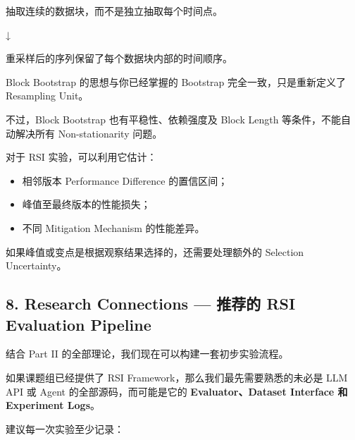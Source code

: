 抽取连续的数据块，而不是独立抽取每个时间点。


↓


重采样后的序列保留了每个数据块内部的时间顺序。

Block Bootstrap 的思想与你已经掌握的 Bootstrap 完全一致，只是重新定义了 Resampling Unit。

不过，Block Bootstrap 也有平稳性、依赖强度及 Block Length 等条件，不能自动解决所有 Non-stationarity 问题。

对于 RSI 实验，可以利用它估计：

\begin{itemize}
\tightlist
\item
  相邻版本 Performance Difference 的置信区间；
\item
  峰值至最终版本的性能损失；
\item
  不同 Mitigation Mechanism 的性能差异。
\end{itemize}

如果峰值或变点是根据观察结果选择的，还需要处理额外的 Selection Uncertainty。

\hypertarget{part-2-27-0001-research-connections-ux63a8ux8350ux7684-rsi-evaluation-pipeline}{%
\subsection{8. Research Connections --- 推荐的 RSI Evaluation Pipeline}\label{part-2-27-0001-research-connections-ux63a8ux8350ux7684-rsi-evaluation-pipeline}}

结合 Part II 的全部理论，我们现在可以构建一套初步实验流程。


如果课题组已经提供了 RSI Framework，那么我们最先需要熟悉的未必是 LLM API 或 Agent 的全部源码，而可能是它的 \textbf{Evaluator、Dataset Interface 和 Experiment Logs}。

建议每一次实验至少记录：

